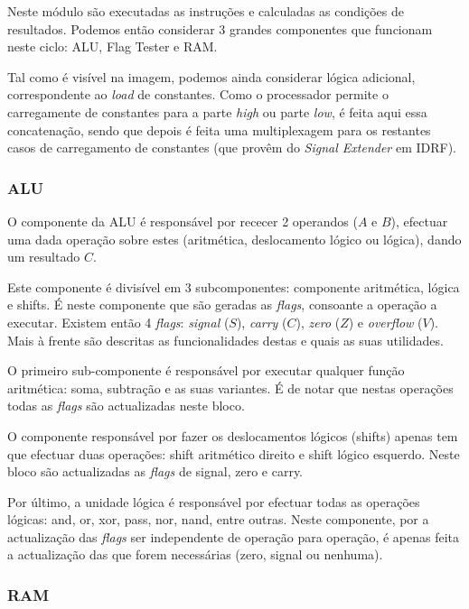 \documentclass[a4paper]{article}
\begin{document}
			Neste módulo são executadas as instruções e calculadas as condições de resultados. Podemos então considerar 3 grandes componentes que funcionam neste ciclo: ALU, Flag Tester e RAM.
			
			Tal como é visível na imagem, podemos ainda considerar lógica adicional, correspondente ao \textit{load} de constantes. Como o processador permite o carregamente de constantes para a parte \textit{high} ou parte \textit{low}, é feita aqui essa concatenação, sendo que depois é feita uma multiplexagem para os restantes casos de carregamento de constantes (que provêm do \textit{Signal Extender} em IDRF).
		
			\subsubsection{ALU}
				
				O componente da ALU é responsável por rececer 2 operandos ($A$ e $B$), efectuar uma dada operação sobre estes (aritmética, deslocamento lógico ou lógica), dando um resultado $C$.
				
				Este componente é divisível em 3 subcomponentes: componente aritmética, lógica e shifts. É neste componente que são geradas as \textit{flags}, consoante a operação a executar. Existem então 4 \textit{flags}: \textit{signal} ($S$), \textit{carry} ($C$), \textit{zero} ($Z$) e \textit{overflow} ($V$). Mais à frente são descritas as funcionalidades destas e quais as suas utilidades.
				
				O primeiro sub-componente é responsável por executar qualquer função aritmética: soma, subtração e as suas variantes. É de notar que nestas operações todas as \textit{flags} são actualizadas neste bloco.
				
				O componente responsável por fazer os deslocamentos lógicos (shifts) apenas tem que efectuar duas operações: shift aritmético direito e shift lógico esquerdo. Neste bloco são actualizadas as \textit{flags} de signal, zero e carry.
				
				Por último, a unidade lógica é responsável por efectuar todas as operações lógicas: and, or, xor, pass, nor, nand, entre outras. Neste componente, por a actualização das \textit{flags} ser independente de operação para operação, é apenas feita a actualização das que forem necessárias (zero, signal ou nenhuma).
			
			\subsubsection{RAM}
				
\end{document}
